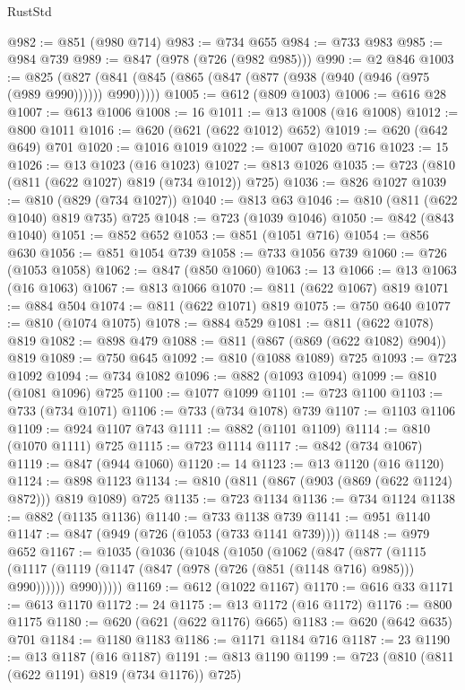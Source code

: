 \begin{lexlean}{RustStd}
\begin{coremodule}
@982 := @851 (@980 @714)
@983 := @734 @655
@984 := @733 @983
@985 := @984 @739
@989 := @847 (@978 (@726 (@982 @985)))
@990 := @2 @846
@1003 := @825 (@827 (@841 (@845 (@865 (@847 (@877 (@938 (@940 (@946 (@975 (@989 @990)))))) @990)))))
@1005 := @612 (@809 @1003)
@1006 := @616 @28
@1007 := @613 @1006
@1008 := 16
@1011 := @13 @1008 (@16 @1008)
@1012 := @800 @1011
@1016 := @620 (@621 (@622 @1012) @652)
@1019 := @620 (@642 @649) @701
@1020 := @1016 @1019
@1022 := @1007 @1020 @716
@1023 := 15
@1026 := @13 @1023 (@16 @1023)
@1027 := @813 @1026
@1035 := @723 (@810 (@811 (@622 @1027) @819 (@734 @1012)) @725)
@1036 := @826 @1027
@1039 := @810 (@829 (@734 @1027))
@1040 := @813 @63
@1046 := @810 (@811 (@622 @1040) @819 @735) @725
@1048 := @723 (@1039 @1046)
@1050 := @842 (@843 @1040)
@1051 := @852 @652
@1053 := @851 (@1051 @716)
@1054 := @856 @630
@1056 := @851 @1054 @739
@1058 := @733 @1056 @739
@1060 := @726 (@1053 @1058)
@1062 := @847 (@850 @1060)
@1063 := 13
@1066 := @13 @1063 (@16 @1063)
@1067 := @813 @1066
@1070 := @811 (@622 @1067) @819
@1071 := @884 @504
@1074 := @811 (@622 @1071) @819
@1075 := @750 @640
@1077 := @810 (@1074 @1075)
@1078 := @884 @529
@1081 := @811 (@622 @1078) @819
@1082 := @898 @479
@1088 := @811 (@867 (@869 (@622 @1082) @904)) @819
@1089 := @750 @645
@1092 := @810 (@1088 @1089) @725
@1093 := @723 @1092
@1094 := @734 @1082
@1096 := @882 (@1093 @1094)
@1099 := @810 (@1081 @1096) @725
@1100 := @1077 @1099
@1101 := @723 @1100
@1103 := @733 (@734 @1071)
@1106 := @733 (@734 @1078) @739
@1107 := @1103 @1106
@1109 := @924 @1107 @743
@1111 := @882 (@1101 @1109)
@1114 := @810 (@1070 @1111) @725
@1115 := @723 @1114
@1117 := @842 (@734 @1067)
@1119 := @847 (@944 @1060)
@1120 := 14
@1123 := @13 @1120 (@16 @1120)
@1124 := @898 @1123
@1134 := @810 (@811 (@867 (@903 (@869 (@622 @1124) @872))) @819 @1089) @725
@1135 := @723 @1134
@1136 := @734 @1124
@1138 := @882 (@1135 @1136)
@1140 := @733 @1138 @739
@1141 := @951 @1140
@1147 := @847 (@949 (@726 (@1053 (@733 @1141 @739))))
@1148 := @979 @652
@1167 := @1035
    (@1036
      (@1048
        (@1050
          (@1062
            (@847
              (@877
                (@1115 (@1117 (@1119 (@1147 (@847 (@978 (@726 (@851 (@1148 @716) @985))) @990))))))
              @990)))))
@1169 := @612 (@1022 @1167)
@1170 := @616 @33
@1171 := @613 @1170
@1172 := 24
@1175 := @13 @1172 (@16 @1172)
@1176 := @800 @1175
@1180 := @620 (@621 (@622 @1176) @665)
@1183 := @620 (@642 @635) @701
@1184 := @1180 @1183
@1186 := @1171 @1184 @716
@1187 := 23
@1190 := @13 @1187 (@16 @1187)
@1191 := @813 @1190
@1199 := @723 (@810 (@811 (@622 @1191) @819 (@734 @1176)) @725)

\end{coremodule}
\end{lexlean}
